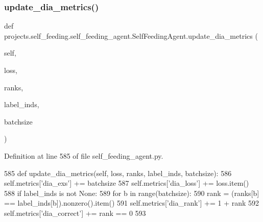 \subsubsection{\texorpdfstring{update\+\_\+dia\+\_\+metrics()}{update\_dia\_metrics()}}
{\footnotesize\ttfamily def projects.\+self\+\_\+feeding.\+self\+\_\+feeding\+\_\+agent.\+Self\+Feeding\+Agent.\+update\+\_\+dia\+\_\+metrics (\begin{DoxyParamCaption}\item[{}]{self,  }\item[{}]{loss,  }\item[{}]{ranks,  }\item[{}]{label\+\_\+inds,  }\item[{}]{batchsize }\end{DoxyParamCaption})}



Definition at line 585 of file self\+\_\+feeding\+\_\+agent.\+py.


\begin{DoxyCode}
585     \textcolor{keyword}{def }update\_dia\_metrics(self, loss, ranks, label\_inds, batchsize):
586         self.metrics[\textcolor{stringliteral}{'dia\_exs'}] += batchsize
587         self.metrics[\textcolor{stringliteral}{'dia\_loss'}] += loss.item()
588         \textcolor{keywordflow}{if} label\_inds \textcolor{keywordflow}{is} \textcolor{keywordflow}{not} \textcolor{keywordtype}{None}:
589             \textcolor{keywordflow}{for} b \textcolor{keywordflow}{in} range(batchsize):
590                 rank = (ranks[b] == label\_inds[b]).nonzero().item()
591                 self.metrics[\textcolor{stringliteral}{'dia\_rank'}] += 1 + rank
592                 self.metrics[\textcolor{stringliteral}{'dia\_correct'}] += rank == 0
593 
\end{DoxyCode}
\mbox{\label{classprojects_1_1self__feeding_1_1self__feeding__agent_1_1SelfFeedingAgent_a39ce3bfde7b4bcf692133012a7a3bcbc}} 
